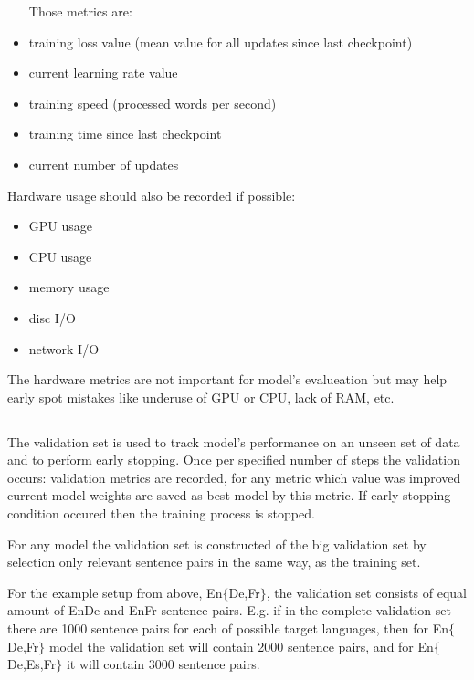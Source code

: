 \begin{samepage}
\begin{itemize}
	\item [Those metrics are:]
	\item training loss value (mean value for all updates since
	last checkpoint)
	\item current learning rate value
	\item training speed (processed words per second)
	\item training time since last checkpoint
	\item current number of updates
\end{itemize}
\end{samepage}
\begin{samepage}
Hardware usage should also be recorded if possible:
\begin{itemize}
	\item GPU usage
	\item CPU usage
	\item memory usage
	\item disc I/O
	\item network I/O
\end{itemize}
\end{samepage}

The hardware metrics are not important for model's evalueation
but may help early spot mistakes like underuse of GPU or CPU, lack of RAM, etc.

\subsection{}
\label{subsection:validation}

The validation set is used to track model's performance
on an unseen set of data and to perform early stopping.
Once per specified number of steps the validation occurs:
validation metrics are recorded, for any metric which value was
improved current model weights are saved as best model by this metric.
If early stopping condition occured then the training process is stopped.

For any model the validation set is constructed of the big validation set
by selection only relevant sentence pairs in the same way, as the training set.

For the example setup from above, En\to{}$\{$De,Fr$\}$, the validation set
consists of equal amount of En\to{}De and En\to{}Fr sentence pairs.
E.g. if in the complete validation set there are 1000 sentence pairs for
each of possible target languages, then for En\to{}$\{$De,Fr$\}$
model the validation set will contain 2000 sentence pairs, and for
En\to{}$\{$De,Es,Fr$\}$ it will contain 3000 sentence pairs.


